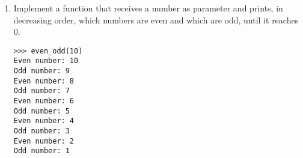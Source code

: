 \begin{enumerate}

\item Implement a function that receives a number as parameter and prints, in decreasing order, which numbers are even and which are odd, until it reaches 0.

\begin{lstlisting}
>>> even_odd(10)
Even number: 10
Odd number: 9
Even number: 8
Odd number: 7
Even number: 6
Odd number: 5
Even number: 4
Odd number: 3
Even number: 2
Odd number: 1
\end{lstlisting}

\end{enumerate}
